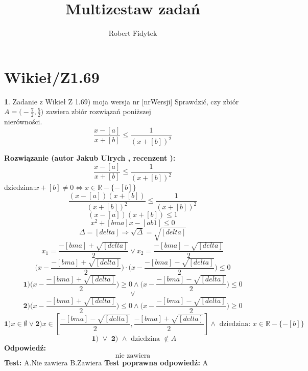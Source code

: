 \documentclass[12pt, a4paper]{article}
\title{Multizestaw zadań}
\author{Robert Fidytek}
\date{}
\theoremstyle{definition} %
\newtheorem{zad}{}
\newcommand{\kategoria}[1]{\section{#1}} %
\newcommand{\zadStart}[1]{\begin{zad}#1\newline} %
\newcommand{\zadStop}{\end{zad}}   %
\newcommand{\rozwStart}[2]{\noindent \textbf{Rozwiązanie (autor #1 , recenzent #2): }\newline} %
\newcommand{\rozwStop}{\newline}                                            %
\newcommand{\odpStart}{\noindent \textbf{Odpowiedź:}\newline}    %
\newcommand{\odpStop}{\newline}                                             %
\newcommand{\testStart}{\noindent \textbf{Test:}\newline} %
\newcommand{\testStop}{\newline} %
\newcommand{\kluczStart}{\noindent \textbf{Test poprawna odpowiedź:}\newline} %
\newcommand{\kluczStop}{\newline} %
\begin{document}
\maketitle


\kategoria{Wikieł/Z1.69}
\zadStart{Zadanie z Wikieł Z 1.69) moja wersja nr [nrWersji]}
Sprawdzić, czy zbiór $A=\big(-\frac{7}{2},\frac{5}{2}\big)$ zawiera zbiór rozwiązań poniższej\\ nierówności.
$$\frac{x-[a]}{x+[b]}\leq\frac{1}{(x+[b])^{2}}$$
\zadStop
\rozwStart{Jakub Ulrych}{}
$$\frac{x-[a]}{x+[b]}\leq\frac{1}{(x+[b])^{2}}$$
dziedzina:$x+[b]\neq0\Leftrightarrow x\in \mathbb{R}-\{-[b]\}$
$$\frac{(x-[a])(x+[b])}{(x+[b])^{2}}\leq\frac{1}{(x+[b])^{2}}$$
$$(x-[a])(x+[b])\leq1$$
$$x^{2}+[bma]x-[ab1]\leq0$$
$$\Delta=[delta]\Rightarrow \sqrt{\Delta}=\sqrt{[delta]}$$
$$x_{1}=\frac{-[bma]+\sqrt{[delta]}}{2} \vee x_{2}=\frac{-[bma]-\sqrt{[delta]}}{2}$$
$$\big(x-\frac{-[bma]+\sqrt{[delta]}}{2}\big)\cdot\big(x-\frac{-[bma]-\sqrt{[delta]}}{2}\big)\leq0$$
$$\textbf{1)}\big(x-\frac{-[bma]+\sqrt{[delta]}}{2}\big)\geq0 \land \big(x-\frac{-[bma]-\sqrt{[delta]}}{2}\big)\leq0$$ $$\vee$$ $$\textbf{2)}\big(x-\frac{-[bma]+\sqrt{[delta]}}{2}\big)\leq0 \land \big(x-\frac{-[bma]-\sqrt{[delta]}}{2}\big)\geq0$$
$$\textbf{1)}x\in\emptyset \vee \textbf{2)}x\in[\frac{-[bma]-\sqrt{[delta]}}{2},\frac{-[bma]+\sqrt{[delta]}}{2}]\land \text{ dziedzina: }x\in \mathbb{R}-\{-[b]\}$$
$$\textbf{ 1) }\vee\textbf{ 2) }\land\text{ dziedzina }\notin A$$
\rozwStop
\odpStart
$$\text{nie zawiera}$$
\odpStop
\testStart
A.$\text{Nie zawiera}$
B.$\text{Zawiera}$
\testStop
\kluczStart
A
\kluczStop
\end{document}
